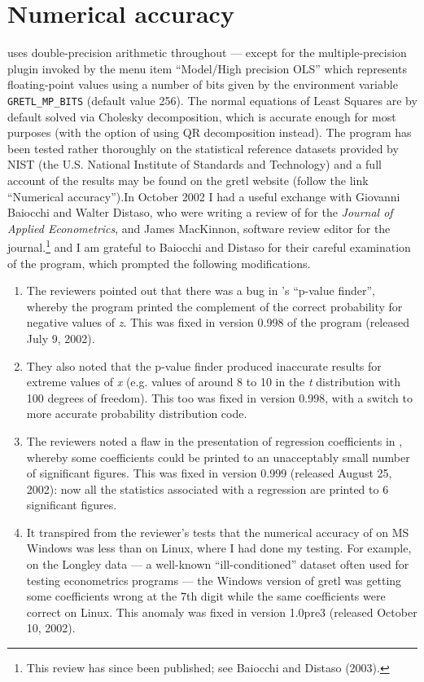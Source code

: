 \chapter{Numerical accuracy}
\label{app-accuracy}

 uses double-precision arithmetic throughout --- except for
the multiple-precision plugin invoked by the menu item ``Model/High
precision OLS'' which represents floating-point values using a number
of bits given by the environment variable \verb+GRETL_MP_BITS+
(default value 256).  The normal equations of Least Squares are by
default solved via Cholesky decomposition, which is accurate enough
for most purposes (with the option of using QR decomposition instead).
The program has been tested rather thoroughly on the statistical
reference datasets provided by NIST (the U.S. National Institute of
Standards and Technology) and a full account of the results may be
found on the gretl website (follow the link ``Numerical accuracy'').In
October 2002 I had a useful exchange with Giovanni Baiocchi and Walter
Distaso, who were writing a review of  for the
\emph{Journal of Applied Econometrics}, and James MacKinnon, software
review editor for the journal.\footnote{This review has since been
  published; see Baiocchi and Distaso (2003).} and I am grateful to
Baiocchi and Distaso for their careful examination of the program,
which prompted the following modifications.

\begin{enumerate}
\item The reviewers pointed out that there was a bug in 's
  ``p-value finder'', whereby the program printed the complement of
  the correct probability for negative values of \emph{z}.  This was
  fixed in version 0.998 of the program (released July 9, 2002).
\item They also noted that the p-value finder produced inaccurate
  results for extreme values of \emph{x} (e.g. values of around 8 to
  10 in the \emph{t} distribution with 100 degrees of freedom).  This
  too was fixed in  version 0.998, with a switch to more
  accurate probability distribution code.
\item The reviewers noted a flaw in the presentation of regression
  coefficients in , whereby some coefficients could be
  printed to an unacceptably small number of significant figures.
  This was fixed in version 0.999 (released August 25, 2002): now all
  the statistics associated with a regression are printed to 6
  significant figures.
\item It transpired from the reviewer's tests that the numerical
  accuracy of  on MS Windows was less than on Linux, where
  I had done my testing.  For example, on the Longley data --- a
  well-known ``ill-conditioned'' dataset often used for testing
  econometrics programs --- the Windows version of gretl was getting
  some coefficients wrong at the 7th digit while the same coefficients
  were correct on Linux.  This anomaly was fixed in 
  version 1.0pre3 (released October 10, 2002).
\end{enumerate}

